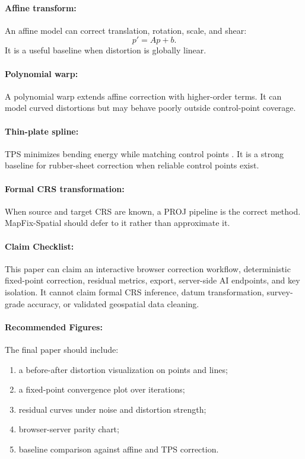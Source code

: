 \documentclass{article}
\begin{document}
\paragraph{Affine transform:}
An affine model can correct translation, rotation, scale, and shear:
\begin{equation}
  p' = Ap+b.
\end{equation}
It is a useful baseline when distortion is globally linear.

\paragraph{Polynomial warp:}
A polynomial warp extends affine correction with higher-order terms. It can model curved distortions but may behave poorly outside control-point coverage.

\paragraph{Thin-plate spline:}
TPS minimizes bending energy while matching control points \citep{bookstein1989principal}. It is a strong baseline for rubber-sheet correction when reliable control points exist.

\paragraph{Formal CRS transformation:}
When source and target CRS are known, a PROJ pipeline is the correct method. MapFix-Spatial should defer to it rather than approximate it.

\paragraph{Claim Checklist:}

This paper can claim an interactive browser correction workflow, deterministic fixed-point correction, residual metrics, export, server-side AI endpoints, and key isolation. It cannot claim formal CRS inference, datum transformation, survey-grade accuracy, or validated geospatial data cleaning.

\paragraph{Recommended Figures:}

The final paper should include:
\begin{enumerate}
  \item a before-after distortion visualization on points and lines;
  \item a fixed-point convergence plot over iterations;
  \item residual curves under noise and distortion strength;
  \item browser-server parity chart;
  \item baseline comparison against affine and TPS correction.
\end{enumerate}
\end{document}
